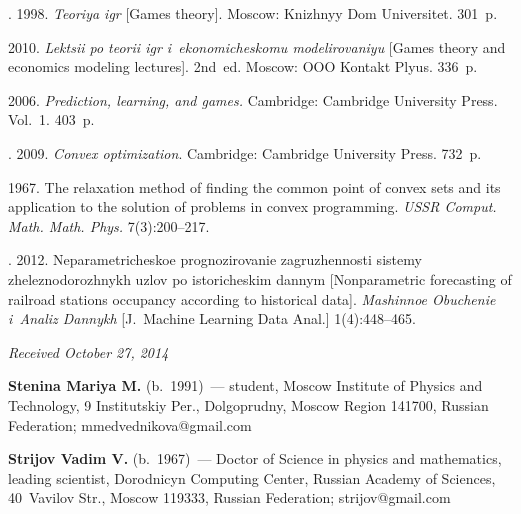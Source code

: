 \begin{multicols}{2}
{{\begin{thebibliography}{99}
    .
    1998. \textit{Teoriya igr} [Games theory]. Moscow: Knizhnyy Dom
    Universitet. 301~p.

 2010. \textit{Lektsii po teorii igr
i~eko\-no\-mi\-che\-sko\-mu modelirovaniyu}     [Games
    theory and economics modeling lectures]. 2nd~ed.
    Moscow: OOO Kontakt Plyus. 336~p.



 2006.
\textit{Prediction, learning, and games.} Cambridge: Cambridge
    University Press. Vol.~1. 403~p.

. 2009. \textit{Convex optimization}.
Cambridge: Cambridge University Press. 732~p.

 1967. The relaxation method of finding the common point
of convex sets and its application to the solution of problems in convex
programming. \textit{USSR Comput. Math. Math. Phys.} 7(3):200--217.

.
2012.
    Neparametricheskoe prognozirovanie zagruzhennosti sistemy
    zheleznodorozhnykh uzlov po istoricheskim dannym [Nonparametric
    forecasting of railroad stations occupancy according to historical
    data]. \textit{Mashinnoe Obuchenie i~Analiz Dannykh} [J.~Machine
    Learning Data Anal.] 1(4):448--465.

    \end{thebibliography}

 }
 }

\end{multicols}

\vspace*{-3pt}

\hfill{\small\textit{Received October 27, 2014}}


    \Contr


    \noindent
    \textbf{Stenina Mariya M.} (b.\ 1991)~---
    student, Moscow Institute of Physics and Technology, 9 Institutskiy Per.,
    Dolgoprudny, Moscow Region 141700, Russian Federation; mmedvednikova@gmail.com

    \vspace*{3pt}

    \noindent
    \textbf{Strijov Vadim V.} (b.\ 1967)~--- Doctor of Science
    in physics and mathematics, leading scientist,
    Dorodnicyn Computing Center, Russian Academy of Sciences, 40~Vavilov Str.,
    Moscow 119333, Russian Federation; strijov@gmail.com






\label{end\stat}


\renewcommand{\bibname}{\protect\rm Литература}